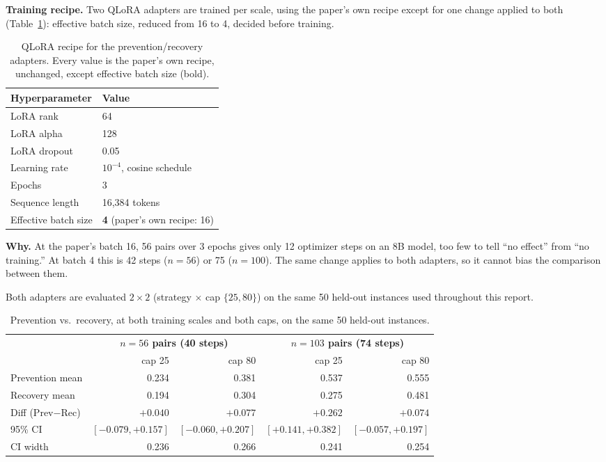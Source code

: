 \documentclass[11pt,a4paper]{article}
\newcommand{\cell}[1]{\textbf{#1}}
\begin{document}
\textbf{Training recipe.} Two QLoRA adapters are trained per scale, using the paper's own
recipe except for one change applied to both (Table~\ref{tab:hparams}): effective batch size,
reduced from 16 to 4, decided before training.

\begin{table}[H]
\centering
\small
\begin{tabular}{@{}ll@{}}
\toprule
\cell{Hyperparameter} & \cell{Value} \\
\midrule
LoRA rank & 64 \\
LoRA alpha & 128 \\
LoRA dropout & 0.05 \\
Learning rate & $10^{-4}$, cosine schedule \\
Epochs & 3 \\
Sequence length & 16{,}384 tokens \\
Effective batch size & \textbf{4} (paper's own recipe: 16) \\
\bottomrule
\end{tabular}
\caption{QLoRA recipe for the prevention/recovery adapters. Every value is the paper's own
recipe, unchanged, except effective batch size (bold).}
\label{tab:hparams}
\end{table}

\textbf{Why.} At the paper's batch 16, 56 pairs over 3 epochs gives only 12 optimizer steps on
an 8B model, too few to tell ``no effect'' from ``no training.'' At batch 4 this is 42 steps
($n=56$) or 75 ($n=100$). The same change applies to both adapters, so it cannot bias the
comparison between them.

Both adapters are evaluated $2\times2$ (strategy $\times$ cap $\{25,80\}$) on the same 50
held-out instances used throughout this report.

\begin{table}[H]
\centering
\small
\begin{tabular}{@{}lrr|rr@{}}
\toprule
 & \multicolumn{2}{c}{\cell{$n=56$ pairs (40 steps)}} & \multicolumn{2}{c}{\cell{$n=103$ pairs (74 steps)}} \\
\cmidrule(lr){2-3} \cmidrule(lr){4-5}
 & cap 25 & cap 80 & cap 25 & cap 80 \\
\midrule
Prevention mean   & 0.234 & 0.381 & 0.537 & 0.555 \\
Recovery mean     & 0.194 & 0.304 & 0.275 & 0.481 \\
Diff (Prev$-$Rec) & $+0.040$ & $+0.077$ & $+0.262$ & $+0.074$ \\
95\% CI           & $[-0.079,+0.157]$ & $[-0.060,+0.207]$ & $\mathbf{[+0.141,+0.382]}$ & $[-0.057,+0.197]$ \\
CI width          & 0.236 & 0.266 & 0.241 & 0.254 \\
\bottomrule
\end{tabular}
\caption{Prevention vs.\ recovery, at both training scales and both caps, on the same 50
held-out instances.}
\label{tab:rq2-main}
\end{table}
\end{document}
